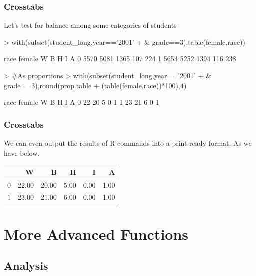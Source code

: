 \documentclass{beamer}
\begin{document}
  
\begin{frame}[containsverbatim]
\frametitle{Crosstabs}
Let's test for balance among some categories of students 
\begin{Schunk}
\begin{Sinput}
> with(subset(student_long,year=='2001' 
+             & grade==3),table(female,race))
\end{Sinput}
\begin{Soutput}
      race
female    W    B    H    I    A
     0 5570 5081 1365  107  224
     1 5653 5252 1394  116  238
\end{Soutput}
\end{Schunk}
\begin{Schunk}
\begin{Sinput}
> #As proportions
> with(subset(student_long,year=='2001' 
+             & grade==3),round(prop.table
+             (table(female,race))*100),4)
\end{Sinput}
\begin{Soutput}
      race
female  W  B  H  I  A
     0 22 20  5  0  1
     1 23 21  6  0  1
\end{Soutput}
\end{Schunk}
\end{frame}

\begin{frame}
\frametitle{Crosstabs}
We can even output the results of R commands into a print-ready format. As we have below.
\begin{table}[ht]
\begin{center}
\begin{tabular}{rrrrrr}
  \hline
 & W & B & H & I & A \\ 
  \hline
0 & 22.00 & 20.00 & 5.00 & 0.00 & 1.00 \\ 
  1 & 23.00 & 21.00 & 6.00 & 0.00 & 1.00 \\ 
   \hline
\end{tabular}
\end{center}
\end{table}\end{frame}

\section{More Advanced Functions}
\subsection{Analysis}
\end{document}
